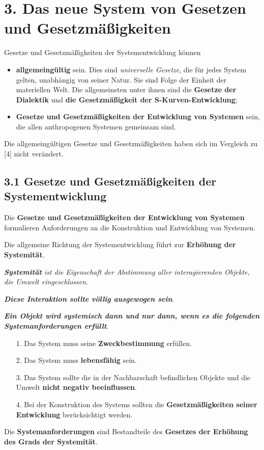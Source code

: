 \documentclass[11pt,a4paper]{article}
\begin{document}
\section{3. Das neue System von Gesetzen und Gesetzmäßigkeiten}
Gesetze und Gesetzmäßigkeiten der Systementwicklung können 
\begin{itemize}
\item \textbf{allgemeingültig} sein. Dies sind \emph{universelle Gesetze}, die
  für jedes System gelten, unabhängig von seiner Natur. Sie sind Folge der
  Einheit der materiellen Welt.  Die allgemeinsten unter ihnen sind die
  \textbf{Gesetze der Dialektik} und \textbf{die Gesetzmäßigkeit der
    S-Kurven-Entwicklung};
\item \textbf{Gesetze und Gesetzmäßigkeiten der Entwicklung von Systemen}
  sein, die allen anthropogenen Systemen gemeinsam sind.
\end{itemize}
Die allgemeingültigen Gesetze und Gesetzmäßigkeiten haben sich im Vergleich zu
[4] nicht verändert.

\subsection{3.1 Gesetze und Gesetzmäßigkeiten der Systementwicklung}

Die \textbf{Gesetze und Gesetzmäßigkeiten der Entwicklung von Systemen}
formulieren Anforderungen an die Konstruktion und Entwicklung von Systemen.

Die allgemeine Richtung der Systementwicklung führt zur \textbf{Erhöhung der
  Systemität}.

\emph{\textbf{Systemität} ist die Eigenschaft der Abstimmung aller
  interagierenden Objekte, die Umwelt eingeschlossen}.

\textbf{\emph{Diese Interaktion sollte völlig ausgewogen sein}}.

\textbf{\emph{Ein Objekt wird systemisch dann und nur dann, wenn es die
    folgenden Systemanforderungen erfüllt}}.
\begin{itemize}[noitemsep]
\item[1.] Das System muss seine \textbf{Zweckbestimmung} erfüllen.
\item[2.] Das System muss \textbf{lebensfähig} sein.
\item[3.] Das System sollte die in der Nachbarschaft befindlichen Objekte
  und die Umwelt \textbf{nicht negativ beeinflussen}.
\item[4.] Bei der Konstruktion des Systems sollten die
  \textbf{Gesetzmäßigkeiten seiner Entwicklung} berücksichtigt werden.
\end{itemize}
Die \textbf{Systemanforderungen} sind Bestandteile des \textbf{Gesetzes der
  Erhöhung des Grads der Systemität}.
\end{document}
